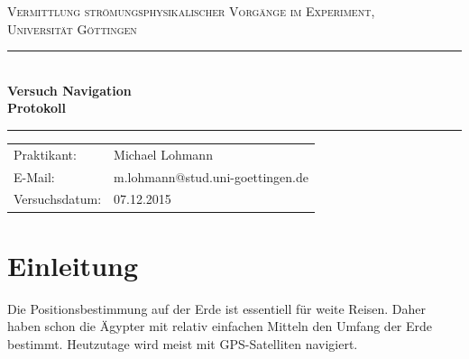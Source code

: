 \documentclass[12pt,a4paper,titlepage,headinclude,bibtotoc]{scrartcl}
\begin{document}
\begin{titlepage}
\centering
\textsc{\Large Vermittlung strömungsphysikalischer Vorgänge im Experiment,
\\[1.5ex] Universität Göttingen}

\vspace*{3cm}

\rule{\textwidth}{1pt}\\[0.5cm]
{\huge \bfseries
  Versuch Navigation  \\[1.5ex]
  Protokoll}\\[0.5cm]
\rule{\textwidth}{1pt}

\vspace*{3cm}

\begin{Large}
\begin{tabular}{ll}
Praktikant: &  Michael Lohmann\\
 E-Mail: & m.lohmann@stud.uni-goettingen.de\\
 Versuchsdatum: & 07.12.2015\\
\end{tabular}
\end{Large}

\vspace*{0.8cm}

\begin{Large}
\end{Large}

\end{titlepage}

\tableofcontents

\newpage

\section{Einleitung}
\label{sec:einleitung}
Die Positionsbestimmung auf der Erde ist essentiell für weite Reisen.
Daher haben schon die Ägypter mit relativ einfachen Mitteln den Umfang der Erde bestimmt.
Heutzutage wird meist mit GPS-Satelliten navigiert.
\end{document}
